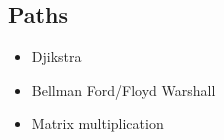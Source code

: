 \documentclass[10pt]{article}
\begin{document}
\subsection{Paths}
\begin{itemize}
    \itemsep0em
    \item Djikstra
    \item Bellman Ford/Floyd Warshall
    \item Matrix multiplication
\end{itemize}


\begin{comment}

\end{comment}
\end{document}
